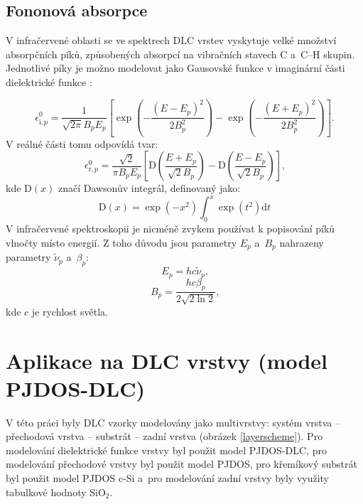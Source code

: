 \subsection{Fononová absorpce}
V infračervené oblasti se ve spektrech DLC vrstev vyskytuje velké množství absorpčních píků, způsobených absorpcí na vibračních stavech C a~C--H skupin. Jednotlivé píky je možno modelovat jako Gausovské funkce v imaginární části dielektrické funkce \cite{Franta2007}:

\begin{equation}
\label{gaus}
\epsilon^0_{\mathrm{i},p} = \frac{1}{\sqrt{2 \pi} B_p E_p} \left[ \exp\left(-\frac{(E-E_p)^2}{2B_p^2}\right) - \exp\left(-\frac{(E+E_p)^2}{2B_p^2}\right) \right] \text{.}
\end{equation}
V reálné části tomu odpovídá tvar:
\begin{equation}
\epsilon^0_{\mathrm{r},p} = \frac{\sqrt{2}}{\pi B_p E_p} \left[ \mathrm{D}\left(\frac{E+E_p}{\sqrt{2}B_p}\right) -\mathrm{D}\left(\frac{E-E_p}{\sqrt{2}B_p}\right) \right] \text{,}
\end{equation}
kde $\mathrm{D}(x)$ značí Dawsonův integrál, definovaný jako:
\begin{equation}
\mathrm{D}(x) = \exp(-x^2)\int_0^x \exp(t^2) \mathrm{d}t
\end{equation}
V infračervené spektroskopii je nicméně zvykem používat k popisování píků vlnočty místo energií. Z toho důvodu jsou parametry $E_p$ a~$B_p$ nahrazeny parametry $\tilde{\nu}_p$ a~$\beta_p$:
\begin{equation}
E_p = h c \tilde{\nu}_p \text{,}
\end{equation}
\begin{equation}
B_p = \frac{h c \beta_p}{2 \sqrt{2 \ln 2}} \text{,}
\end{equation}
kde $c$ je rychlost světla. 




\section{Aplikace na DLC vrstvy (model PJDOS-DLC)}
V této práci byly DLC vzorky modelovány jako multivrstvy: systém vrstva -- přechodová vrstva -- substrát -- zadní vrstva (obrázek \ref{layerscheme}). Pro modelování dielektrické funkce vrstvy byl použit model PJDOS-DLC, pro modelování přechodové vrstvy byl použit model PJDOS, pro křemíkový substrát byl použit model PJDOS c-Si a~pro modelování zadní vrstvy byly využity tabulkové hodnoty SiO$_2$.

